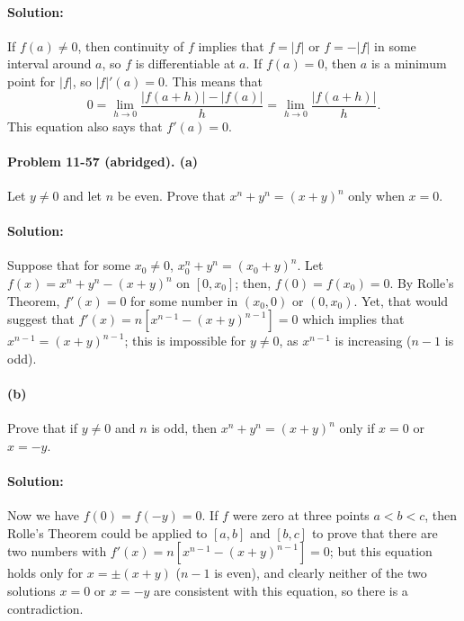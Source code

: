\documentclass{article}
\begin{document}
\paragraph{Solution:} If $f(a) \neq 0$, then continuity of $f$ implies that $f
= |f|$ or $f = -|f|$ in some interval around $a$, so $f$ is differentiable
at $a$. If $f(a) = 0$, then $a$ is a minimum point for $|f|$, so $|f|'(a) = 0$.
This means that \begin{equation*}
  0 = \lim_{h \rightarrow 0} \frac{|f(a + h)| - |f(a)|}{h} = \lim_{h
    \rightarrow 0} \frac{|f(a + h)|}{h}.
\end{equation*} This equation also says that $f'(a) = 0$.

\paragraph{Problem 11-57 (abridged). (a)} Let $y \neq 0$ and let $n$ be even.
Prove that $x^n + y^n = (x + y)^n$ only when $x = 0$.

\paragraph{Solution:} Suppose that for some $x_0 \neq 0$, $x_0^n + y^n = (x_0 +
y)^n$. Let $f(x) = x^n + y^n - (x + y)^n$ on $[0, x_0]$; then, $f(0) = f(x_0) =
0$. By Rolle's Theorem, $f'(x) = 0$ for some number in $(x_0, 0)$ or $(0,
x_0)$. Yet, that would suggest that $f'(x) = n[x^{n - 1} - (x + y)^{n - 1}] =
0$ which implies that $x^{n - 1} = (x + y)^{n - 1}$; this is impossible for $y
\neq 0$, as $x^{n - 1}$ is increasing ($n - 1$ is odd).

\paragraph{(b)} Prove that if $y \neq 0$ and $n$ is odd, then $x^n + y^n = (x +
y)^n$ only if $x = 0$ or $x = -y$.

\paragraph{Solution:} Now we have $f(0) = f(-y) = 0$. If $f$ were zero at three
points $a < b < c$, then Rolle's Theorem could be applied to $[a, b]$ and $[b,
c]$ to prove that there are two numbers with $f'(x) = n[x^{n - 1} - (x + y)^{n
- 1}] = 0$; but this equation holds only for $x = \pm(x + y)$ ($n - 1$ is
even), and clearly neither of the two solutions $x = 0$ or $x = -y$ are
consistent with this equation, so there is a contradiction.
\end{document}
